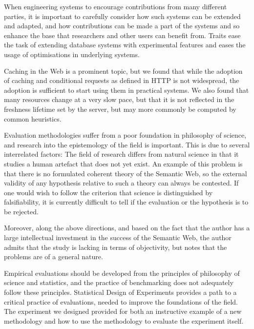 When engineering systems to encourage contributions from many
different parties, it is important to carefully consider how such
systems can be extended and adapted, and how contributions can be made
a part of the systems and so enhance the base that researchers and
other users can benefit from. Traits ease the task of extending
database systems with experimental features and eases the usage of
optimisations in underlying systems.

Caching in the Web is a prominent topic, but we found that while the
adoption of caching and conditional requests as defined in HTTP is not
widespread, the adoption is sufficient to start using them in
practical systems. We also found that many resources change at a very
slow pace, but that it is not reflected in the freshness lifetime set
by the server, but may more commonly be computed by common heuristics.


Evaluation methodologies suffer from a poor foundation in philosophy
of science, and research into the epistemology of the field is
important. This is due to several interrelated factors: The field of
research differs from natural science in that it studies a human
artefact that does not yet exist. An example of this problem is that
there is no formulated coherent theory of the Semantic Web, so the
external validity of any hypothesis relative to such a theory can
always be contested. If one would wish to follow the criterion that
science is distinguished by falsifiability, it is currently difficult
to tell if the evaluation or the hypothesis is to be rejected.

Moreover, along the above directions, and based on the fact that the
author has a large intellectual investment in the success of the
Semantic Web, the author admits that the study is lacking in terms of
objectivity, but notes that the problems are of a general nature.

Empirical evaluations should be developed from the principles of
philosophy of science and statistics, and the practice of benchmarking
does not adequately follow these principles. Statistical Design of
Experiments provides a path to a critical practice of evaluations,
needed to improve the foundations of the field. The experiment we
designed provided for both an instructive example of a new methodology
and how to use the methodology to evaluate the experiment itself.

